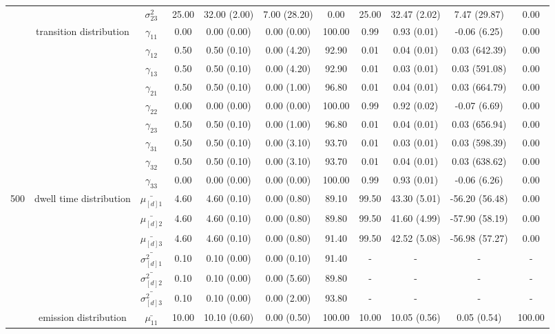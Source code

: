 \begin{table}[h]
{\begin{tabular}{ccccccccccc}
 &  & $\sigma^2_{23}$ & 25.00 & 32.00 (2.00) & 7.00 (28.20) & 0.00 & 25.00 & 32.47 (2.02) & 7.47 (29.87) & 0.00 \\
 & transition distribution & $\gamma_{11}$ & 0.00 & 0.00 (0.00) & 0.00 (0.00) & 100.00 & 0.99 & 0.93 (0.01) & -0.06 (6.25) & 0.00 \\
 & \multirow{8}{*}{} & $\gamma_{12}$ & 0.50 & 0.50 (0.10) & 0.00 (4.20) & 92.90 & 0.01 & 0.04 (0.01) & 0.03 (642.39) & 0.00 \\
 &  & $\gamma_{13}$ & 0.50 & 0.50 (0.10) & 0.00 (4.20) & 92.90 & 0.01 & 0.03 (0.01) & 0.03 (591.08) & 0.00 \\
 &  & $\gamma_{21}$ & 0.50 & 0.50 (0.10) & 0.00 (1.00) & 96.80 & 0.01 & 0.04 (0.01) & 0.03 (664.79) & 0.00 \\
 &  & $\gamma_{22}$ & 0.00 & 0.00 (0.00) & 0.00 (0.00) & 100.00 & 0.99 & 0.92 (0.02) & -0.07 (6.69) & 0.00 \\
 &  & $\gamma_{23}$ & 0.50 & 0.50 (0.10) & 0.00 (1.00) & 96.80 & 0.01 & 0.04 (0.01) & 0.03 (656.94) & 0.00 \\
 &  & $\gamma_{31}$ & 0.50 & 0.50 (0.10) & 0.00 (3.10) & 93.70 & 0.01 & 0.03 (0.01) & 0.03 (598.39) & 0.00 \\
 &  & $\gamma_{32}$ & 0.50 & 0.50 (0.10) & 0.00 (3.10) & 93.70 & 0.01 & 0.04 (0.01) & 0.03 (638.62) & 0.00 \\
 &  & $\gamma_{33}$ & 0.00 & 0.00 (0.00) & 0.00 (0.00) & 100.00 & 0.99 & 0.93 (0.01) & -0.06 (6.26) & 0.00 \\ \midrule
500 & dwell time distribution & $\bar{\mu_{[d]1}}$ & 4.60 & 4.60 (0.10) & 0.00 (0.80) & 89.10 & 99.50 & 43.30 (5.01) & -56.20 (56.48) & 0.00 \\
\multirow{26}{*}{} & \multirow{5}{*}{} & $\bar{\mu_{[d]2}}$ & 4.60 & 4.60 (0.10) & 0.00 (0.80) & 89.80 & 99.50 & 41.60 (4.99) & -57.90 (58.19) & 0.00 \\
 &  & $\bar{\mu_{[d]3}}$ & 4.60 & 4.60 (0.10) & 0.00 (0.80) & 91.40 & 99.50 & 42.52 (5.08) & -56.98 (57.27) & 0.00 \\
 &  & $\bar{\sigma^2_{[d]1}}$ & 0.10 & 0.10 (0.00) & 0.00 (0.10) & 91.40 & - & - & - & - \\
 &  & $\bar{\sigma^2_{[d]2}}$ & 0.10 & 0.10 (0.00) & 0.00 (5.60) & 89.80 & - & - & - & - \\
 &  & $\bar{\sigma^2_{[d]3}}$ & 0.10 & 0.10 (0.00) & 0.00 (2.00) & 93.80 & - & - & - & - \\
 & emission distribution & $\bar{\mu_{11}}$ & 10.00 & 10.10 (0.60) & 0.00 (0.50) & 100.00 & 10.00 & 10.05 (0.56) & 0.05 (0.54) & 100.00 \\

\end{tabular}}
\end{table}
